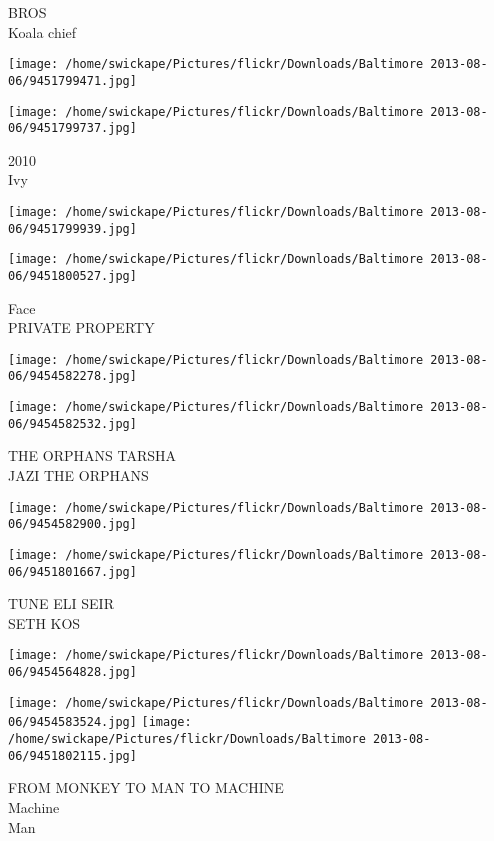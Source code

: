 \documentclass[10pt,letterpaper]{article}
\begin{document}
BROS\\
Koala chief
\pagebreak

\texttt{[image: /home/swickape/Pictures/flickr/Downloads/Baltimore 2013-08-06/9451799471.jpg]}

\vspace{0.25in}
\texttt{[image: /home/swickape/Pictures/flickr/Downloads/Baltimore 2013-08-06/9451799737.jpg]}

2010\\
Ivy
\pagebreak

\texttt{[image: /home/swickape/Pictures/flickr/Downloads/Baltimore 2013-08-06/9451799939.jpg]}

\vspace{0.25in}
\texttt{[image: /home/swickape/Pictures/flickr/Downloads/Baltimore 2013-08-06/9451800527.jpg]}

Face\\
PRIVATE PROPERTY
\pagebreak

\texttt{[image: /home/swickape/Pictures/flickr/Downloads/Baltimore 2013-08-06/9454582278.jpg]}

\vspace{0.25in}
\texttt{[image: /home/swickape/Pictures/flickr/Downloads/Baltimore 2013-08-06/9454582532.jpg]}

THE ORPHANS TARSHA\\
JAZI THE ORPHANS
\pagebreak

\texttt{[image: /home/swickape/Pictures/flickr/Downloads/Baltimore 2013-08-06/9454582900.jpg]}

\vspace{0.25in}
\texttt{[image: /home/swickape/Pictures/flickr/Downloads/Baltimore 2013-08-06/9451801667.jpg]}

TUNE ELI SEIR\\
SETH KOS
\pagebreak

\texttt{[image: /home/swickape/Pictures/flickr/Downloads/Baltimore 2013-08-06/9454564828.jpg]}

\vspace{0.25in}
\texttt{[image: /home/swickape/Pictures/flickr/Downloads/Baltimore 2013-08-06/9454583524.jpg]}
\texttt{[image: /home/swickape/Pictures/flickr/Downloads/Baltimore 2013-08-06/9451802115.jpg]}

FROM MONKEY TO MAN TO MACHINE\\
Machine\\
Man
\pagebreak
\end{document}
